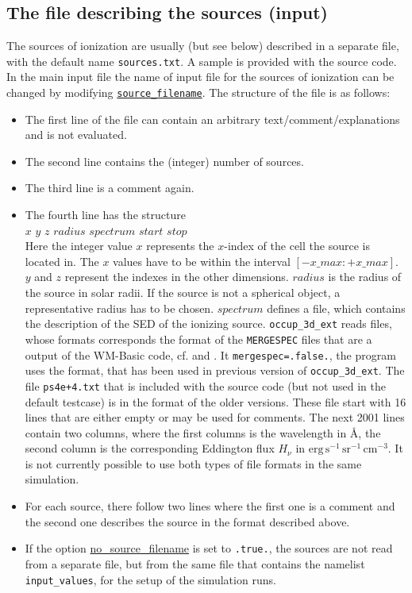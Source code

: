 \documentclass[a4paper,10pt]{article}
\begin{document}
\subsection{The file describing the sources (input)}
\label{file:sources}
The sources of ionization are usually (but see below) described in a separate 
file, with the default  name \texttt{sources.txt}. A sample is provided with 
the source code. In the 
main input file the name of input file for the sources of ionization can be 
changed by modifying \texttt{\hyperref[opt:sourcefilename]{source\_filename}}.
The structure of the file is as follows:
\begin{itemize}
\item The first line of the file can contain an arbitrary 
text/comment/explanations and is not evaluated.
\item The second line contains the (integer) number of sources.
\item The third line is a comment again.
\item The fourth line has the structure\\
$x$ $y$ $z$ $radius$ $spectrum$ $start$ $stop$\\
Here the integer value $x$ represents the $x$-index of the cell the source is 
located in. The $x$ values have to be within the interval $[-x\_max : 
+x\_max]$. $y$ and $z$ represent the indexes in the other dimensions. $radius$ 
is the radius of the source in solar radii. If the source is not a spherical 
object, a representative radius has to be chosen. $spectrum$ defines a file, 
which contains 
the description of the SED of the ionizing source. 
\texttt{occup\_3d\_ext} reads files, whose formats corresponds the format of 
the \texttt{MERGESPEC} files that are a output of the WM-Basic code, cf. \cite 
{Pauldrach2001} and \cite{Hoffmann2012}. It 
\texttt{mergespec=.false.}, the program uses the  format, that has been used in 
previous version of \texttt{occup\_3d\_ext}. The file \texttt{ps4e+4.txt} that 
is included with the source code (but not used in the default testcase) is in 
the format of the  older  versions. These file start with 16 
lines that are either empty or may be used for comments. The next 2001 lines 	
contain two columns, where the first columns is the wavelength in \AA{}, the 
second column is the corresponding Eddington flux $H_\nu$ in 
$\mathrm{erg\,s^{-1}\,sr^{-1}\,cm^{-3}}$. It is not currently possible to use 
both types of file formats in the same simulation. 
\item For each source, there follow two lines where the 
first one is a comment and the second one describes the source in the format 
described above. 
\item If the option \hyperref[opt:nosourcefilename]{no\_source\_filename} is 
set to \texttt{.true.}, the sources are not read from a separate file, but from 
the same file that contains the namelist
\texttt{input\_values}, for the setup of the simulation runs.
\end{itemize}
\end{document}
